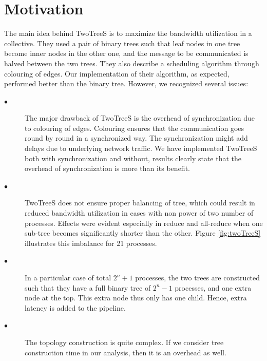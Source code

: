 \documentclass[sigplan,review,anonymous]{acmart}\settopmatter{printfolios=true,printccs=false,printacmref=false}
\begin{document}


\section{Motivation}\label{sec:Motivation}
The main idea behind TwoTreeS is to maximize the bandwidth utilization in a collective. They used a pair of binary trees such that leaf nodes in one tree become inner nodes in the other one, and the message to be communicated is halved between the two trees.  They also describe a scheduling algorithm through colouring of edges. Our implementation of their algorithm, as expected, performed better than the binary tree. However, we recognized several issues:

\begin{description}
    \item[$\bullet$]The major drawback of TwoTreeS is the overhead of synchronization due to colouring of edges. Colouring ensures that the communication goes round by round in a synchronized way. The synchronization might add delays due to underlying network traffic. We have implemented TwoTreeS both with synchronization and without, results clearly state that the overhead of synchronization is more than its benefit.
    \item[$\bullet$]TwoTreeS does not ensure proper balancing of tree, which could result in reduced bandwidth utilization in cases with non power of two number of processes. Effects were evident especially in reduce and all-reduce when one sub-tree becomes significantly shorter than the other. Figure \ref{fig:twoTreeS} illustrates this imbalance for 21 processes.
    \item[$\bullet$]In a particular case of total \(2^n+1\) processes, the two trees are constructed such that they have a full binary tree of \(2^n-1\) processes, and one extra node at the top. This extra node thus only has one child. Hence, extra latency is added to the pipeline.
    \item[$\bullet$]The topology construction is quite complex. If we consider tree construction time in our analysis, then it is an overhead as well.
\end{description}

\end{document}
